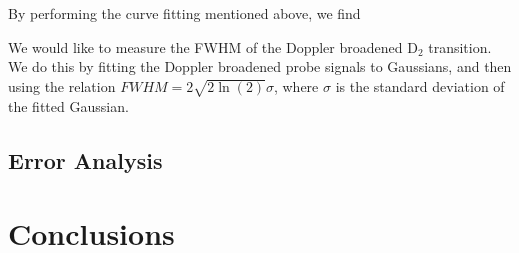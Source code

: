 \documentclass[12pt]{article}
\begin{document}
By performing the curve fitting mentioned above, we find 

We would like to measure the FWHM of the Doppler broadened D$_2$ transition.  We do this by fitting the Doppler broadened probe signals to Gaussians, and then using the relation $FWHM = 2 \sqrt{2 \ln(2)}\sigma$, where $\sigma$ is the standard deviation of the fitted Gaussian.




\subsection*{Error Analysis}

\section*{Conclusions}





\end{document}
